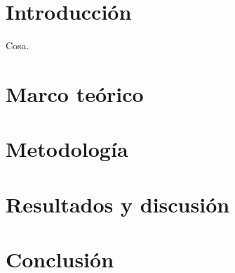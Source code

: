 \documentclass[a4paper,twoside,openright]{report}
\begin{document}
\tableofcontents

\section{Introducción}
Cosa. 

\section{Marco teórico}

\section{Metodología}

\section{Resultados y discusión}

\section{Conclusión}

\printbibliography[heading=bibintoc]

\end{document}
